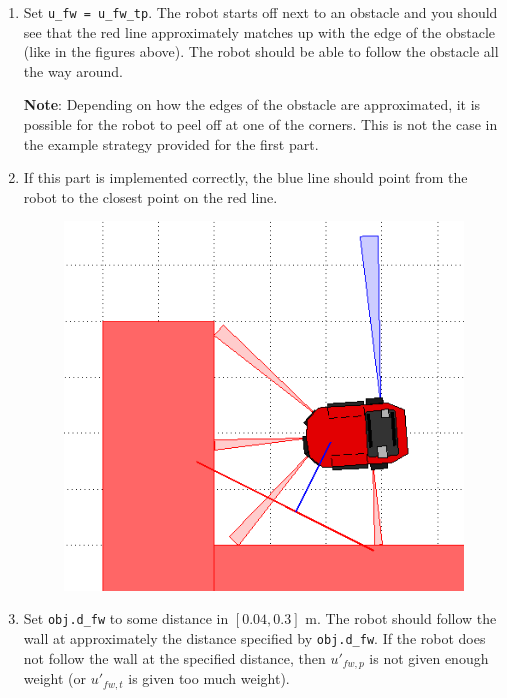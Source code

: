 \documentclass[10pt]{article}
\begin{document}
\begin{enumerate}
	\item Set \texttt{u\_fw = u\_fw\_tp}. The robot starts off next to an obstacle and you should see that the red line approximately matches up with the edge of the obstacle (like in the figures above). The robot should be able to follow the obstacle all the way around.
	
	\textbf{Note}: Depending on how the edges of the obstacle are approximated, it is possible for the robot to peel off at one of the corners. This is not the case in the example strategy provided for the first part.
	
	\item If this part is implemented correctly, the blue line should point from the robot to the closest point on the red line.
	
	\begin{figure}[h]
		\centering
		\includegraphics[scale=0.5]{images/week-6-part-2.png}
		\label{fig:week6part2}
	\end{figure}
	
	
	\item Set \texttt{obj.d\_fw} to some distance in $[0.04,0.3]$ m. The robot should follow the wall at approximately the distance specified by \texttt{obj.d\_fw}. If the robot does not follow the wall at the specified distance, then $u'_{fw,p}$ is not given enough weight (or $u'_{fw,t}$ is given too much weight).
	
\end{enumerate}
\end{document}
